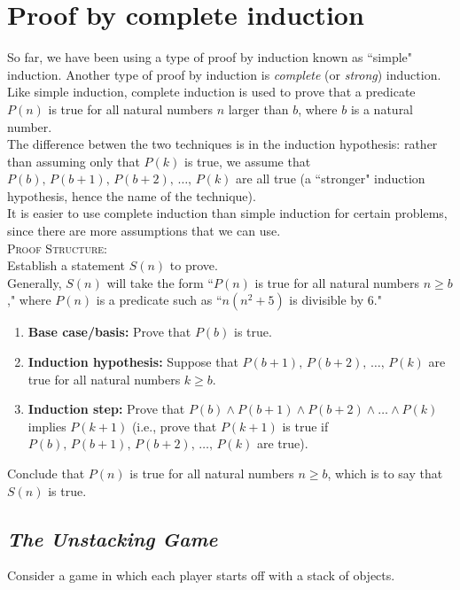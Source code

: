 \documentclass{article}
\begin{document}
\section{\sc Proof by complete induction}
So far, we have been using a type of proof by induction known as ``simple" induction. Another type of proof by induction is \textit{complete} (or \textit{strong}) induction.\\[1ex]
Like simple induction, complete induction is used to prove that a predicate $P(n)$ is true for all natural numbers $n$ larger than $b$, where $b$ is a natural number.\\[1ex]
The difference betwen the two techniques is in the induction hypothesis: rather than assuming only that $P(k)$ is true, we assume that $P(b),\,P(b+1),\,P(b+2),\,\ldots,\,P(k)$ are all true (a ``stronger" induction hypothesis, hence the name of the technique).\\[1ex]
It is easier to use complete induction than simple induction for certain problems, since there are more assumptions that we can use.\\[1em]
\textsc{Proof Structure:}\\[1ex]
Establish a statement $S(n)$ to prove.\\
Generally, $S(n)$ will take the form ``$P(n)$ is true for all natural numbers $n\geq b$," where $P(n)$ is a predicate such as ``$n(n^2+5)$ is divisible by 6."
\begin{enumerate}
\item \textbf{Base case/basis:} Prove that $P(b)$ is true.
\item \textbf{Induction hypothesis:} Suppose that $P(b+1),\,P(b+2),\,\ldots,\,P(k)$ are true for all natural numbers $k\geq b$.
\item \textbf{Induction step:} Prove that $P(b)\wedge P(b+1)\wedge P(b+2)\wedge\ldots\wedge P(k)$ implies $P(k+1)$ (i.e., prove that $P(k+1)$ is true if $P(b),\,P(b+1),\,P(b+2),\,\ldots,\,P(k)$ are true).
\end{enumerate}
Conclude that $P(n)$ is true for all natural numbers $n\geq b$, which is to say that $S(n)$ is true.

\subsection*{\em The Unstacking Game}
Consider a game in which each player starts off with a stack of objects.
\end{document}
